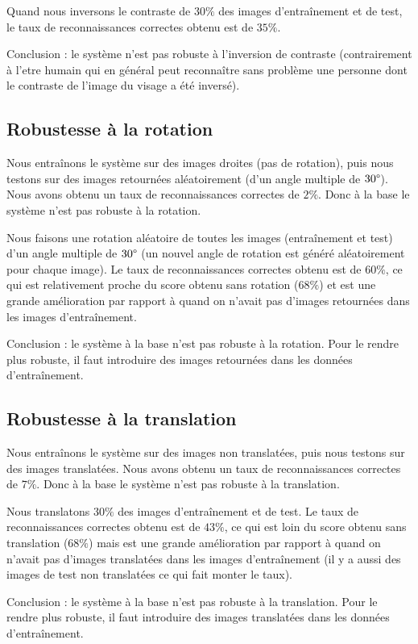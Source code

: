 Quand nous inversons le contraste de $30\%$ des images d'entraînement et de test, le taux de
reconnaissances correctes obtenu est de $35\%$.

Conclusion : le système n'est pas robuste à l'inversion de contraste (contrairement à l'etre
humain qui en général peut reconnaître sans problème une personne dont le contraste de l'image
du visage a été inversé).


\subsection{Robustesse à la rotation}
Nous entraînons le système sur des images droites (pas de rotation), puis nous testons sur des images
retournées aléatoirement (d'un angle multiple de $30\degree$). Nous avons obtenu un taux de
reconnaissances correctes de $2\%$. Donc à la base le système n'est pas robuste à la rotation.

Nous faisons une rotation aléatoire de toutes les images (entraînement et test) d'un angle
multiple de $30\degree$ (un nouvel   angle de rotation est généré aléatoirement pour chaque
image). Le taux de reconnaissances correctes obtenu est de $60\%$, ce qui est relativement
proche du score obtenu sans rotation ($68\%$) et est une grande amélioration par rapport à
quand on n'avait pas d'images retournées dans les images d'entraînement.

Conclusion : le système à la base n'est pas robuste à la rotation. Pour le rendre plus robuste,
il faut introduire des images retournées dans les données d'entraînement.


\subsection{Robustesse à la translation}
Nous entraînons le système sur des images non translatées, puis nous testons sur des images
translatées. Nous avons obtenu un taux de
reconnaissances correctes de $7\%$. Donc à la base le système n'est pas robuste à la translation.

Nous translatons $30\%$ des images d'entraînement et de test. 
Le taux de reconnaissances correctes obtenu est de $43\%$, ce qui est loin
du score obtenu sans translation ($68\%$) mais est une grande amélioration par rapport à
quand on n'avait pas d'images translatées dans les images d'entraînement (il y a aussi
des images de test non translatées ce qui fait monter le taux).

Conclusion : le système à la base n'est pas robuste à la translation. Pour le rendre plus robuste,
il faut introduire des images translatées dans les données d'entraînement.
